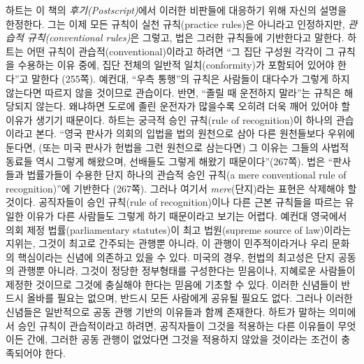 \documentclass[12pt, oneside]{book}  %
\begin{document}
하트는 이 책의 \emph{후기(Postscript)}에서 이러한 비판들에 대응하기 위해
자신의 설명을 한정한다. 그는 이제 모든 규칙이 실천 규칙(practice
rules)은 아니라고 인정하지만, \emph{관습적 규칙(conventional rules)}은
그렇고, 법은 그러한 규칙들에 기반한다고 말한다. 하트는 어떤 규칙이
관습적(conventional)이라고 하려면 ``그 집단 구성원 각각이 그 규칙을
수용하는 이유 중에, 집단 전체의 일반적 일치(conformity)가 포함되어
있어야 한다''고 말한다 (255쪽). 예컨대, ``우측 통행''의 규칙은 사람들이
대다수가 그렇게 하지 않는다면 따르지 않을 것이므로 관습이다. 반면,
``졸릴 때 운전하지 말라''는 규칙은 해당되지 않는다. 왜냐하면 도로에 졸린
운전자가 많을수록 오히려 더욱 깨어 있어야 할 이유가 생기기 때문이다.
하트는 궁극적 승인 규칙(rule of recognition)이 하나의 관습이라고 본다.
``영국 판사가 의회의 입법을 법의 원천으로 삼아 다른 원천들보다 우위에
둔다면, (또는 미국 판사가 헌법을 그런 원천으로 삼는다면) 그 이유는
그들의 사법적 동료들 역시 그렇게 해왔으며, 선배들도 그렇게 해왔기
때문이다''(267쪽). 법은 ``판사들과 법률가들이 수용한 단지 하나의 관습적
승인 규칙(a mere conventional rule of recognition)''에 기반한다 (267쪽).
그러나 여기서 \emph{mere}(단지)라는 표현은 삭제해야 할 것이다.
공직자들이 승인 규칙(rule of recognition)이나 다른 근본 규칙들을 따르는
유일한 이유가 다른 사람들도 그렇게 하기 때문이라고 보기는 어렵다. 예컨대
영국에서 의회 제정 법률(parliamentary statutes)이 최고 법원(supreme
source of law)이라는 지위는, 그것이 최고로 간주되는 관행뿐 아니라, 이
관행이 민주적이라거나 우리 문화의 핵심이라는 신념에 의존하고 있을 수
있다. 미국의 경우, 헌법의 최고성은 단지 공동의 관행뿐 아니라, 그것이
정당한 정부형태를 구성한다는 믿음이나, 지혜로운 사람들이 제정한 것이므로
그것에 충실해야 한다는 믿음에 기초할 수 있다. 이러한 신념들이 반드시
올바를 필요는 없으며, 반드시 모든 사람에게 공유될 필요도 없다. 그러나
이러한 신념들은 일반적으로 공동 관행 기반의 이유들과 함께 존재한다.
하트가 말하는 의미에서 승인 규칙이 관습적이라고 하려면, 공직자들이
그것을 적용하는 다른 이유들이 무엇이든 간에, 그러한 공동 관행이 없었다면
그것을 적용하지 않았을 것이라는 조건이 충족되어야 한다.
\end{document}
